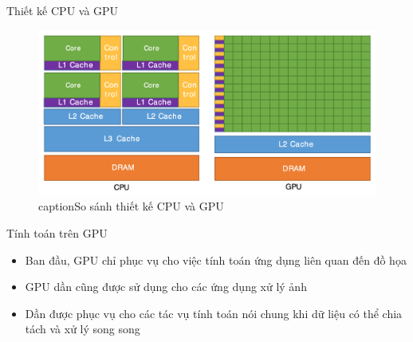 \documentclass[10pt]{beamer}
\theoremstyle{remark}
\numberwithin{algocf}{section}
\numberwithin{equation}{section}
\numberwithin{dl}{section}
\numberwithin{figure}{section}
\begin{document}
\begin{frame}{Thiết kế CPU và GPU}
    \begin{figure}[H]
        \centering
        \includegraphics[height=0.7\textheight]{figures/CUDA/CPUvsGPU_design.png}
        caption{So sánh thiết kế CPU và GPU}
    \end{figure}
\end{frame}

\begin{frame}{Tính toán trên GPU}
    \begin{itemize}
        \item Ban đầu, GPU chỉ phục vụ cho việc tính toán ứng dụng liên quan đến đồ họa
        \item GPU dần cũng được sử dụng cho các ứng dụng xử lý ảnh
        \item Dần được phục vụ cho các tác vụ tính toán nói chung khi dữ liệu có thể chia tách và xử lý song song
    \end{itemize}
\end{frame}
\end{document}
